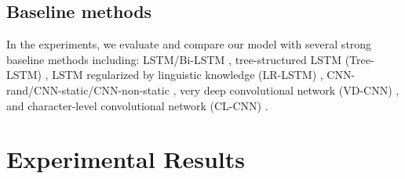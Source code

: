\documentclass[11pt]{article}
\begin{document}
\subsection{Baseline methods}
In the experiments, we evaluate and compare our model with several strong baseline methods including: LSTM/Bi-LSTM  \cite{cho2014learning}, tree-structured LSTM (Tree-LSTM) \cite{tai2015improved}, LSTM regularized by linguistic knowledge (LR-LSTM) \cite{qian2016linguistically}, CNN-rand/CNN-static/CNN-non-static \cite{kim2014convolutional}, very deep convolutional network (VD-CNN) \cite{conneau2017very}, and character-level convolutional network (CL-CNN) \cite{zhang2015character}. 



\section{Experimental Results}
\begin{table}[h!]
	\centering
{}
    \caption{Comparisons of our capsule networks and baselines on six text classification benchmarks. }
    \label{tab:1}
    \vspace{-0.5cm}
\end{table}
\end{document}
